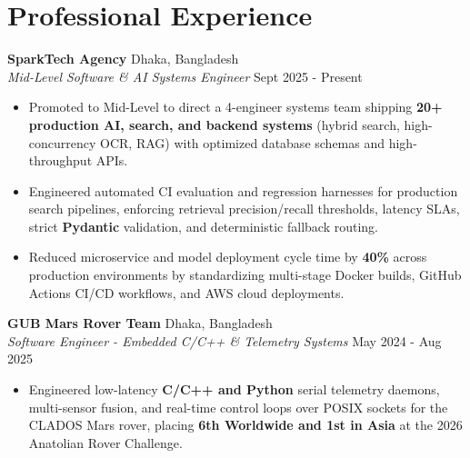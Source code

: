 \documentclass[9.5pt,a4paper]{article}
\begin{document}
\section*{Professional Experience}
\noindent
\textbf{SparkTech Agency} \hfill Dhaka, Bangladesh\\
\textit{Mid-Level Software & AI Systems Engineer} \hfill Sept 2025 - Present
\begin{itemize}
    \item Promoted to Mid-Level to direct a 4-engineer systems team shipping \textbf{20+ production AI, search, and backend systems} (hybrid search, high-concurrency OCR, RAG) with optimized database schemas and high-throughput APIs.
    \item Engineered automated CI evaluation and regression harnesses for production search pipelines, enforcing retrieval precision/recall thresholds, latency SLAs, strict \textbf{Pydantic} validation, and deterministic fallback routing.
    \item Reduced microservice and model deployment cycle time by \textbf{40\%} across production environments by standardizing multi-stage Docker builds, GitHub Actions CI/CD workflows, and AWS cloud deployments.
\end{itemize}
\vspace{0.6pt}
\noindent
\textbf{GUB Mars Rover Team} \hfill Dhaka, Bangladesh\\
\textit{Software Engineer - Embedded C/C++ & Telemetry Systems} \hfill May 2024 - Aug 2025
\begin{itemize}
    \item Engineered low-latency \textbf{C/C++ and Python} serial telemetry daemons, multi-sensor fusion, and real-time control loops over POSIX sockets for the CLADOS Mars rover, placing \textbf{6th Worldwide and 1st in Asia} at the 2026 Anatolian Rover Challenge.
\end{itemize}
\vspace{0.6pt}
\end{document}

